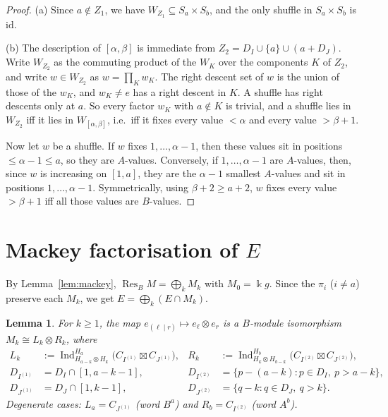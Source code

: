\documentclass[11pt]{amsart}
\newcommand{\Ind}{\operatorname{Ind}}
\newcommand{\Res}{\operatorname{Res}}
\newcommand{\kk}{\Bbbk}
\newcommand{\sq}{\boxtimes}
\theoremstyle{plain}
\newtheorem{lemma}{Lemma}[section]
\theoremstyle{definition}
\begin{document}
\begin{proof}
(a) Since $a\notin Z_1$, we have $W_{Z_1}\subseteq S_a\times S_b$, and the only shuffle in $S_a\times S_b$ is $\mathrm{id}$.

(b) The description of $[\alpha,\beta]$ is immediate from $Z_2=D_I\cup\{a\}\cup(a+D_J)$. Write $W_{Z_2}$ as the commuting product of the $W_K$ over the components $K$ of $Z_2$, and write $w\in W_{Z_2}$ as $w=\prod_Kw_K$. The right descent set of $w$ is the union of those of the $w_K$, and $w_K\ne e$ has a right descent in $K$. A shuffle has right descents only at $a$. So every factor $w_K$ with $a\notin K$ is trivial, and a shuffle lies in $W_{Z_2}$ iff it lies in $W_{[\alpha,\beta]}$, i.e.\ iff it fixes every value $<\alpha$ and every value $>\beta+1$.

Now let $w$ be a shuffle. If $w$ fixes $1,\dots,\alpha-1$, then these values sit in positions $\le\alpha-1\le a$, so they are $A$-values. Conversely, if $1,\dots,\alpha-1$ are $A$-values, then, since $w$ is increasing on $[1,a]$, they are the $\alpha-1$ smallest $A$-values and sit in positions $1,\dots,\alpha-1$. Symmetrically, using $\beta+2\ge a+2$, $w$ fixes every value $>\beta+1$ iff all those values are $B$-values.
\end{proof}

\section{Mackey factorisation of \texorpdfstring{$E$}{E}}

By Lemma~\ref{lem:mackey}, $\Res_BM=\bigoplus_kM_k$ with $M_0=\kk g$. Since the $\pi_i$ ($i\ne a$) preserve each $M_k$, we get $E=\bigoplus_k(E\cap M_k)$.

\begin{lemma}\label{lem:LR}
For $k\ge1$, the map $e_{(\ell\mid r)}\mapsto e_\ell\otimes e_r$ is a $B$-module isomorphism $M_k\cong L_k\otimes R_k$, where
\begin{align*}
L_k&:=\Ind_{H_{a-k}\otimes H_k}^{H_a}\bigl(C_{I^{(1)}}\sq C_{J^{(1)}}\bigr), & R_k&:=\Ind_{H_k\otimes H_{b-k}}^{H_b}\bigl(C_{I^{(2)}}\sq C_{J^{(2)}}\bigr),\\
D_{I^{(1)}}&=D_I\cap[1,a-k-1], & D_{I^{(2)}}&=\{p-(a-k):p\in D_I,\ p>a-k\},\\
D_{J^{(1)}}&=D_J\cap[1,k-1], & D_{J^{(2)}}&=\{q-k:q\in D_J,\ q>k\}.
\end{align*}
Degenerate cases: $L_a=C_{J^{(1)}}$ (word $B^a$) and $R_b=C_{I^{(2)}}$ (word $A^b$).
\end{lemma}
\end{document}

